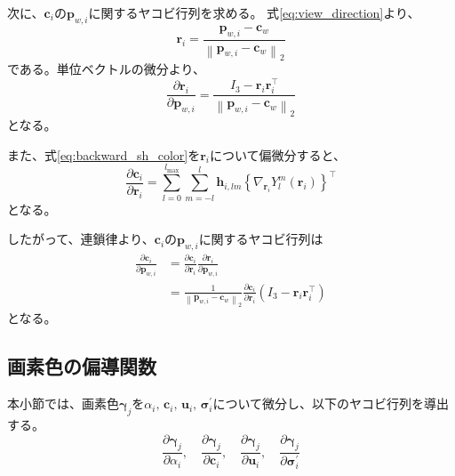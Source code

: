 \documentclass[dvipdfmx]{jlreq}
\begin{document}
次に、$\bm{c}_i$の$\bm{p}_{w,i}$に関するヤコビ行列を求める。
式\eqref{eq:view_direction}より、
\begin{equation}
    \bm{r}_i = \frac{\bm{p}_{w,i}-\bm{c}_w}{\left\lVert\bm{p}_{w,i}-\bm{c}_w\right\rVert_2}
    \label{eq:backward_view_direction}
\end{equation}
である。単位ベクトルの微分より、
\begin{equation}
    \frac{\partial\bm{r}_i}{\partial\bm{p}_{w,i}} =\frac{I_3-\bm{r}_i\bm{r}_i^{\top}}{\left\lVert\bm{p}_{w,i}-\bm{c}_w\right\rVert_2}
    \label{eq:view_direction_position_jacobian}
\end{equation}
となる。

また、式\eqref{eq:backward_sh_color}を$\bm{r}_i$について偏微分すると、
\begin{equation}
    \frac{\partial\bm{c}_i}{\partial\bm{r}_i} = \sum_{l=0}^{l_{\max}}\sum_{m=-l}^{l}\bm{h}_{i,lm} \left\{\nabla_{\bm{r}_i}Y_l^m(\bm{r}_i)\right\}^{\top}
    \label{eq:color_view_direction_jacobian}
\end{equation}
となる。

したがって、連鎖律より、$\bm{c}_i$の$\bm{p}_{w,i}$に関するヤコビ行列は
\begin{equation}
    \begin{aligned}
        \frac{\partial\bm{c}_i}{\partial\bm{p}_{w,i}}
        &=
        \frac{\partial\bm{c}_i}{\partial\bm{r}_i} \frac{\partial\bm{r}_i}{\partial\bm{p}_{w,i}} \\
        &=
        \frac{1}{\left\lVert\bm{p}_{w,i}-\bm{c}_w\right\rVert_2} \frac{\partial\bm{c}_i}{\partial\bm{r}_i} \left(I_3-\bm{r}_i\bm{r}_i^{\top}\right)
    \end{aligned}
    \label{eq:color_world_position_jacobian}
\end{equation}
となる。

\subsection{画素色の偏導関数}
本小節では、画素色$\bm{\gamma}_j$を$\alpha_i,\,\bm{c}_i,\,\bm{u}_i,\,\bm{\sigma}_i^{\prime}$について微分し、以下のヤコビ行列を導出する。
\begin{equation*}
    \frac{\partial\bm{\gamma}_j}{\partial\alpha_i}, \quad \frac{\partial\bm{\gamma}_j}{\partial\bm{c}_i}, \quad \frac{\partial\bm{\gamma}_j}{\partial\bm{u}_i}, \quad \frac{\partial\bm{\gamma}_j}{\partial\bm{\sigma}_i^{\prime}}
\end{equation*}
\end{document}
